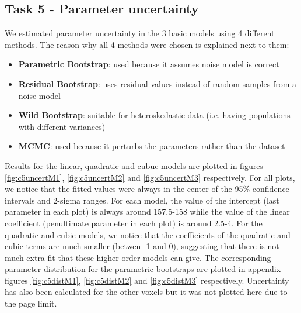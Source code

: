 \documentclass[11pt,a4paper,oneside]{report}
\begin{document}
\subsection*{Task 5 - Parameter uncertainty}

We estimated parameter uncertainty in the 3 basic models using 4 different methods. The reason why all 4 methods were chosen is explained next to them:
\begin{itemize}
 \item \textbf{Parametric Bootstrap}: used because it assumes noise model is correct
 \item \textbf{Residual Bootstrap}: uses residual values instead of random samples from a noise model
 \item \textbf{Wild Bootstrap}: suitable for heteroskedastic data (i.e. having populations with different variances)
 \item \textbf{MCMC}: used because it perturbs the parameters rather than the dataset 
 \end{itemize}

Results for the linear, quadratic and cubuc models are plotted in figures \ref{fig:c5uncertM1}, \ref{fig:c5uncertM2} and \ref{fig:c5uncertM3} respectively. For all plots, we notice that the fitted values were always in the center of the 95\% confidence intervals and 2-sigma ranges. For each model, the value of the intercept (last parameter in each plot) is always around 157.5-158 while the value of the linear coefficient (penultimate parameter in each plot) is around 2.5-4. For the quadratic and cubic models, we notice that the coefficients of the quadratic and cubic terms are much smaller (betwen -1 and 0), suggesting that there is not much extra fit that these higher-order models can give. The corresponding parameter distribution for the parametric bootstraps are plotted in appendix figures \ref{fig:c5distM1}, \ref{fig:c5distM2} and \ref{fig:c5distM3} respectively. Uncertainty has also been calculated for the other voxels but it was not plotted here due to the page limit. 
\end{document}
